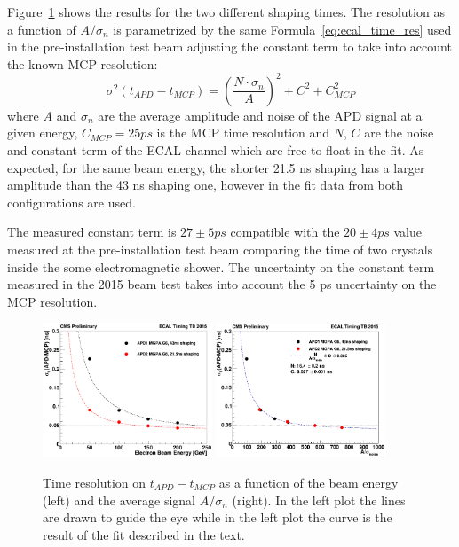 Figure~\ref{fig:results_treso} shows the results for the two different shaping times.
The resolution as a function of $A/\sigma_{n}$ is parametrized by the same Formula~\ref{eq:ecal_time_res} used in the
pre-installation test beam adjusting the constant term to take into account the known MCP resolution:
\[
  \sigma^2(t_{APD} - t_{MCP}) = \left( \frac{N\cdot\sigma_n}{A} \right)^2 + C^2 + C_{MCP}^2
\]
where $A$ and $\sigma_n$ are the average amplitude and noise of the APD signal at a given energy, $C_{MCP} = 25 ps$ is
the MCP time resolution and $N$, $C$ are the noise and constant term of the ECAL channel which are free to float in the fit.
As expected, for the same beam energy, the shorter 21.5 ns shaping has a larger amplitude than the 43 ns shaping one,
however in the fit data from both configurations are used.

The measured constant term is $27 \pm 5 ps$ compatible with the $20 \pm 4 ps$ value measured at the
pre-installation test beam comparing the time of two crystals inside the some electromagnetic shower.
The uncertainty on the constant term measured in the 2015 beam test takes into account the 5 ps uncertainty
on the MCP resolution.

\begin{figure}[h!]
  \centering
  \includegraphics[width = 0.45\textwidth]{figures/upgrade/APD_t_res_vs_energy.png}
  \includegraphics[width = 0.45\textwidth]{figures/upgrade/APD_t_res_vs_AoverN.png}
  \caption{Time resolution on $t_{APD}-t_{MCP}$ as a function of the beam energy (left)
    and the average signal $A/\sigma_n$ (right).
    In the left plot the lines are drawn to guide the eye while in the left plot the curve is the result of the
    fit described in the text.}
  \label{fig:results_treso}
\end{figure}

